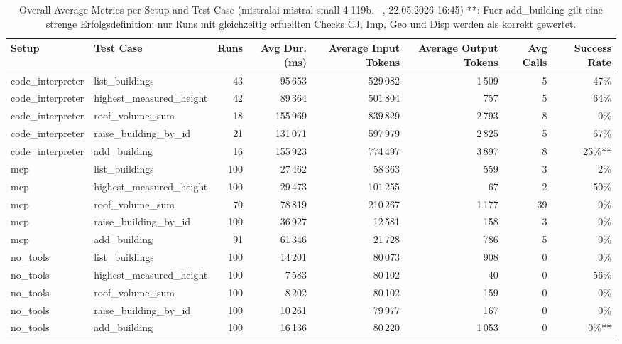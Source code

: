 \documentclass[a4paper,11pt]{article}
\begin{document}
\begin{table}[H]
\centering
\scriptsize
\caption{Overall Average Metrics per Setup and Test Case (mistralai-mistral-small-4-119b, --, 22.05.2026 16:45) **: Fuer add\_building gilt eine strenge Erfolgsdefinition: nur Runs mit gleichzeitig erfuellten Checks CJ, Imp, Geo und Disp werden als korrekt gewertet.}
\begin{tabular}{l l r r r r r r}
\toprule
Setup & Test Case & Runs & Avg Dur. (ms) & Average Input Tokens & Average Output Tokens & Avg Calls & Success Rate \\
\midrule
code\_interpreter & list\_buildings & 43 & 95\,653 & 529\,082 & 1\,509 & 5 & 47\% \\
code\_interpreter & highest\_measured\_height & 42 & 89\,364 & 501\,804 & 757 & 5 & 64\% \\
code\_interpreter & roof\_volume\_sum & 18 & 155\,969 & 839\,829 & 2\,793 & 8 & 0\% \\
code\_interpreter & raise\_building\_by\_id & 21 & 131\,071 & 597\,979 & 2\,825 & 5 & 67\% \\
code\_interpreter & add\_building & 16 & 155\,923 & 774\,497 & 3\,897 & 8 & 25\%** \\
\midrule
mcp & list\_buildings & 100 & 27\,462 & 58\,363 & 559 & 3 & 2\% \\
mcp & highest\_measured\_height & 100 & 29\,473 & 101\,255 & 67 & 2 & 50\% \\
mcp & roof\_volume\_sum & 70 & 78\,819 & 210\,267 & 1\,177 & 39 & 0\% \\
mcp & raise\_building\_by\_id & 100 & 36\,927 & 12\,581 & 158 & 3 & 0\% \\
mcp & add\_building & 91 & 61\,346 & 21\,728 & 786 & 5 & 0\% \\
\midrule
no\_tools & list\_buildings & 100 & 14\,201 & 80\,073 & 908 & 0 & 0\% \\
no\_tools & highest\_measured\_height & 100 & 7\,583 & 80\,102 & 40 & 0 & 56\% \\
no\_tools & roof\_volume\_sum & 100 & 8\,202 & 80\,102 & 159 & 0 & 0\% \\
no\_tools & raise\_building\_by\_id & 100 & 10\,261 & 79\,977 & 167 & 0 & 0\% \\
no\_tools & add\_building & 100 & 16\,136 & 80\,220 & 1\,053 & 0 & 0\%** \\
\bottomrule
\end{tabular}
\end{table}

\clearpage
\end{document}
